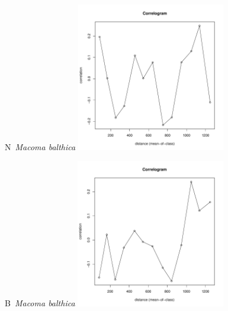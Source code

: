 \documentclass[12pt, a4paper]{disser}
\begin{document}
	\begin{figure}[h]

	\begin{minipage}[b]{.46\linewidth}
	\begin{center}
	{\small N~{\it Macoma balthica}}
		\includegraphics[width=65mm]{../Barenc_Sea/distribution_Moran/Plyazh07_moran_N_Macoma_balthica_.pdf}
	\end{center}
	\end{minipage}
%
	\hfil %
%
	\begin{minipage}[b]{.46\linewidth}
	\begin{center}
	{\small B~{\it Macoma balthica}}
		\includegraphics[width=65mm]{../Barenc_Sea/distribution_Moran/Plyazh07_moran_B_Macoma_balthica_.pdf}
	\end{center}
	\end{minipage}


\end{figure}
\end{document}
